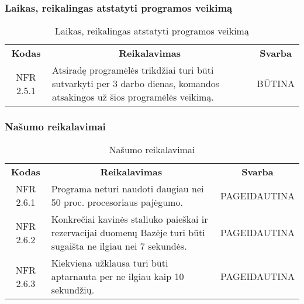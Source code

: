 \documentclass{VUMIFPSkursinis}
\begin{document}
\subsubsection{Laikas, reikalingas atstatyti programos veikimą}
\begin{center}
	\begin{table}[H]
	\begin{tabular}{|p{2cm}|p{}|p{}|}
	\hline
	    \rowcolor{lightgray}
		\multicolumn{3}{|c|}{Laikas, reikalingas atstatyti programos veikimą}\\
		
	\hline
		\multicolumn{1}{|c|}{{\bfseries Kodas}}&
		\multicolumn{1}{|c|}{{\bfseries Reikalavimas}}&
		\multicolumn{1}{|c|}{{\bfseries Svarba}}\\
	\hline 	
		\multicolumn{1}{|c|}{NFR 2.5.1}&
		{Atsiradę programėlės trikdžiai turi būti sutvarkyti per 3 darbo dienas, komandos atsakingos už šios programėlės veikimą.}&
		\multicolumn{1}{|c|}{BŪTINA}\\		
	\hline
	
	
	\end{tabular}
	\caption{Laikas, reikalingas atstatyti programos veikimą}
	\label{table:Laikasreikalingasatstatytiprogramosveikimą}
	\end{table}

\end{center}


\subsubsection{Našumo reikalavimai}
\begin{center}
	\begin{table}[H]
	\begin{tabular}{|p{2cm}|p{}|p{}|}
	\hline
	    \rowcolor{lightgray}
		\multicolumn{3}{|c|}{Našumo reikalavimai}\\
		
	\hline
		\multicolumn{1}{|c|}{{\bfseries Kodas}}&
		\multicolumn{1}{|c|}{{\bfseries Reikalavimas}}&
		\multicolumn{1}{|c|}{{\bfseries Svarba}}\\
	\hline 	
		\multicolumn{1}{|c|}{NFR 2.6.1}&
		{Programa neturi naudoti daugiau nei 50 proc. procesoriaus pajėgumo.}&
		\multicolumn{1}{|p{1.5cm}|}{PAGEIDAUTINA}\\	
	\hline 	
		\multicolumn{1}{|c|}{NFR 2.6.2}&
		{Konkrečiai kavinės staliuko paieškai ir rezervacijai duomenų Bazėje turi būti sugaišta ne ilgiau nei 7 sekundės.}&
		\multicolumn{1}{|p{1.5cm}|}{PAGEIDAUTINA}\\	
	\hline 	
		\multicolumn{1}{|c|}{NFR 2.6.3}&
		{Kiekviena užklausa turi būti aptarnauta per ne ilgiau kaip 10 sekundžių.}&
		\multicolumn{1}{|p{1.5cm}|}{PAGEIDAUTINA}\\		
	\hline
	
	
	\end{tabular}
	\caption{Našumo reikalavimai}
	\label{table:Našumoreikalavimai}
	\end{table}

\end{center}
\end{document}
